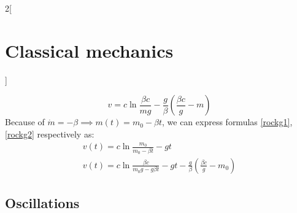 \documentclass[../../../main.tex]{subfiles}
\begin{document}
\begin{multicols}{2}[\section{Classical mechanics}]
\begin{prop}
\begin{equation}
            v=c\ln\frac{\beta c}{mg}-\frac{g}{\beta}\left(\frac{\beta c}{g}-m\right)
            \label{rockg2}
        \end{equation}
        Because of $\dot{m}=-\beta\implies m(t)=m_0-\beta t$, we can express formulas \eqref{rockg1}, \eqref{rockg2} respectively as:
        \begin{gather*}
            v(t)=c\ln\frac{m_0}{m_0-\beta t}-gt\\
            v(t)=c\ln\frac{\beta c}{m_0g-g\beta t}-gt-\frac{g}{\beta}\left(\frac{\beta c}{g}-m_0\right)
        \end{gather*}
    \end{prop}
    \subsection{Oscillations}

\end{multicols}
\end{document}

